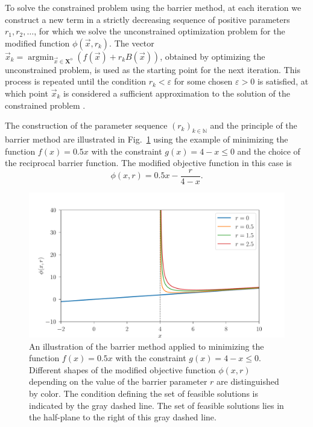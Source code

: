 To solve the constrained problem using the barrier method, at each iteration we construct a new term in a strictly decreasing sequence of positive parameters $ r_1, r_2, \dots$, for which we solve the unconstrained optimization problem for the modified function $ \phi (\vec{x}, r_k)$. The vector $ \vec{x}_k  = \operatorname*{argmin}_{\vec{x} \in \mathbf{X}^\mathrm{o}} (f(\vec{x}) + r_k B(\vec{x})) $, obtained by optimizing the unconstrained problem, is used as the starting point for the next iteration. This process is repeated until the condition $ r_k < \varepsilon$ for some chosen $ \varepsilon > 0$ is satisfied, at which point $ \vec{x}_k $ is considered a sufficient approximation to the solution of the constrained problem \cite{non-linear-textbook}.

The construction of the parameter sequence $ (r_k)_{k \in \mathbb{N}} $ and the principle of the barrier method are illustrated in Fig.~\ref{fig:barrier} using the example of minimizing the function $ f(x) = 0.5x $ with the constraint $ g(x) = 4 - x \leq 0 $ and the choice of the reciprocal barrier function. The modified objective function in this case is
\begin{equation}
	\phi (x, r) = 0.5x - \frac{r}{4-x}.
\end{equation}

\begin{figure}[H]
	\centering
	\includegraphics[width=1.0\textwidth]{figures/barrier.pdf}
	\caption{An illustration of the barrier method applied to minimizing the function $ f(x) = 0.5x $ with the constraint $ g(x) = 4 - x \leq 0 $. Different shapes of the modified objective function $ \phi (x, r) $ depending on the value of the barrier parameter $ r $ are distinguished by color. The condition defining the set of feasible solutions is indicated by the gray dashed line. The set of feasible solutions lies in the half-plane to the right of this gray dashed line.}
	\label{fig:barrier}
\end{figure}

